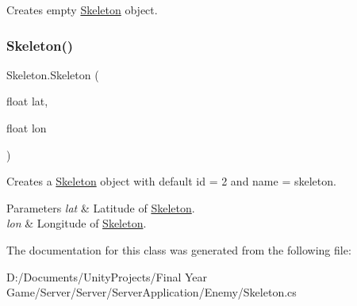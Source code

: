 Creates empty \mbox{\hyperlink{class_skeleton}{Skeleton}} object. 

\mbox{\label{class_skeleton_a46c25f00abbbdfb8a0ab268285f13cb9}} 
\subsubsection{\texorpdfstring{Skeleton()}{Skeleton()}\hspace{0.1cm}{\footnotesize\ttfamily [2/2]}}
{\footnotesize\ttfamily Skeleton.\+Skeleton (\begin{DoxyParamCaption}\item[{float}]{lat,  }\item[{float}]{lon }\end{DoxyParamCaption})}



Creates a \mbox{\hyperlink{class_skeleton}{Skeleton}} object with default id = 2 and name = skeleton. 


\begin{DoxyParams}{Parameters}
{\em lat} & Latitude of \mbox{\hyperlink{class_skeleton}{Skeleton}}.\\
\hline
{\em lon} & Longitude of \mbox{\hyperlink{class_skeleton}{Skeleton}}.\\
\hline
\end{DoxyParams}


The documentation for this class was generated from the following file\+:\begin{DoxyCompactItemize}
\item 
D\+:/\+Documents/\+Unity\+Projects/\+Final Year Game/\+Server/\+Server/\+Server\+Application/\+Enemy/Skeleton.\+cs\end{DoxyCompactItemize}
